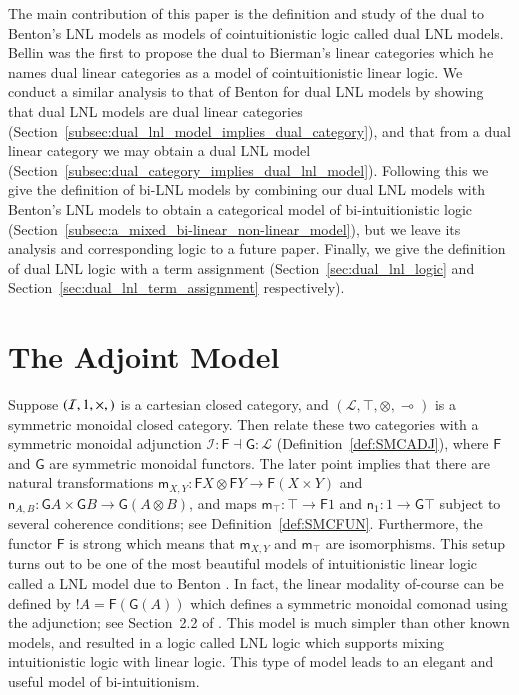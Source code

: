 \documentclass{lmcs}
\let\mto\to
\let\to\relax
\newcommand{\to}{\rightarrow}
\newcommand{\cat}[1]{\mathcal{#1}}
\newcommand{\func}[1]{\mathsf{#1}}
\newcommand{\limp}[0]{\multimap}
\newcommand{\m}[1]{\mathsf{m}_{#1}}
\newcommand{\n}[1]{\mathsf{n}_{#1}}
\begin{document}
The main contribution of this paper is the definition and study of the
dual to Benton's LNL models as models of cointuitionistic logic called
dual LNL models.  Bellin \cite{Bellin:2012} was the first to propose
the dual to Bierman's \cite{Bierman:1994} linear categories which he
names dual linear categories as a model of cointuitionistic linear
logic.  We conduct a similar analysis to that of Benton for dual LNL
models by showing that dual LNL models are dual linear categories
(Section~\ref{subsec:dual_lnl_model_implies_dual_category}), and that
from a dual linear category we may obtain a dual LNL model
(Section~\ref{subsec:dual_category_implies_dual_lnl_model}).
Following this we give the definition of bi-LNL models by combining
our dual LNL models with Benton's LNL models to obtain a categorical
model of bi-intuitionistic logic
(Section~\ref{subsec:a_mixed_bi-linear_non-linear_model}), but we
leave its analysis and corresponding logic to a future paper.
Finally, we give the definition of dual LNL logic with a term
assignment (Section~\ref{sec:dual_lnl_logic} and
Section~\ref{sec:dual_lnl_term_assignment} respectively).

\section{The Adjoint Model}
\label{sec:adjoint_model}

Suppose $(\cat{I}, 1, \times, \to)$ is a cartesian closed category,
and $(\cat{L}, \top, \otimes, \limp)$ is a symmetric monoidal closed
category.  Then relate these two categories with a symmetric monoidal
adjunction $\cat{I} : \func{F} \dashv \func{G} : \cat{L}$
(Definition~\ref{def:SMCADJ}), where $\func{F}$ and $\func{G}$ are
symmetric monoidal functors.  The later point implies that there are
natural transformations $\m{X,Y} : \func{F}X \otimes \func{F}Y \mto
\func{F}(X \times Y)$ and $\n{A,B} : \func{G}A \times \func{G}B \mto
\func{G}(A \otimes B)$, and maps $\m\top : \top \mto \func{F}1$ and
$\n1 : 1 \mto \func{G}\top$ subject to several coherence conditions;
see Definition~\ref{def:SMCFUN}.  Furthermore, the functor $\func{F}$
is strong which means that $\m{X,Y}$ and $\m{\top}$ are isomorphisms.
This setup turns out to be one of the most beautiful models of
intuitionistic linear logic called a LNL model due to Benton
\cite{Benton:1994}.  In fact, the linear modality of-course can be
defined by $!A = \func{F}(\func{G}(A))$ which defines a symmetric
monoidal comonad using the adjunction; see Section~2.2 of
\cite{Benton:1994}.  This model is much simpler than other known
models, and resulted in a logic called LNL logic which supports mixing
intuitionistic logic with linear logic.  This type of model leads to
an elegant and useful model of bi-intuitionism.
\end{document}
